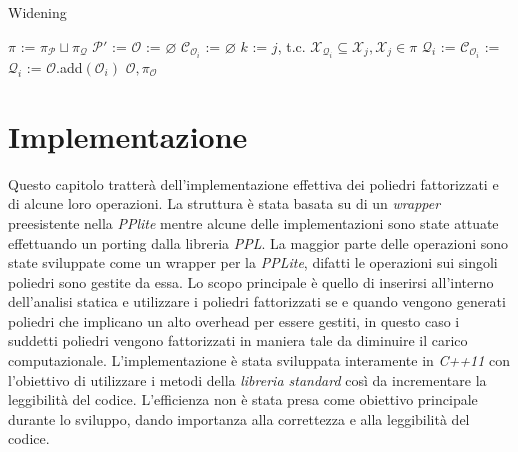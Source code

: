 \documentclass{mimosis}
\theoremstyle{definition}
\let\emptyset\varnothing
\begin{document}
\begin{algorithm}[H]
\caption{Widening}\label{widening}
\begin{algorithmic}[1]
\State $\pi$ := $\pi_{\mathcal{P}} \sqcup \pi_{\mathcal{Q}}$
\State $\mathcal{P}'$ := 
\State $\mathcal{O}$ := $\emptyset$
\State $\mathcal{C}_{\mathcal{O}_i}$ := $\emptyset$
\State $k$ := $j$, t.c. $\mathcal{X}_{\mathcal{Q}_i} \subseteq \mathcal{X}_j, \mathcal{X}_j \in \pi$
\State $\mathcal{Q}_i$ := 
\Else
\State $\mathcal{C}_{\mathcal{O}_i}$ := 
\State $\mathcal{Q}_i$ := 
\EndIf
\State $\mathcal{O}$.add$(\mathcal{O}_i)$
\EndFor
\State\Return $\mathcal{O}, \pi_{\mathcal{O}}$
\EndFunction
\end{algorithmic}
\end{algorithm}

\chapter{Implementazione}
\label{sec:org0925812}
Questo capitolo tratterà dell'implementazione effettiva dei poliedri
fattorizzati e di alcune loro operazioni. La struttura è stata basata su di un
\emph{wrapper} preesistente nella \emph{PPlite} mentre alcune delle implementazioni sono
state attuate effettuando un porting dalla libreria \emph{PPL}. La maggior parte delle
operazioni sono state sviluppate come un wrapper per la \emph{PPLite}, difatti le
operazioni sui singoli poliedri sono gestite da essa. Lo scopo principale è
quello di inserirsi all'interno dell'analisi statica e utilizzare i poliedri
fattorizzati se e quando vengono generati poliedri che implicano un alto
overhead per essere gestiti, in questo caso i suddetti poliedri vengono
fattorizzati in maniera tale da diminuire il carico computazionale.
L'implementazione è stata sviluppata interamente in \emph{C++11} con l'obiettivo di
utilizzare i metodi della \emph{libreria standard} così da incrementare la leggibilità
del codice. L'efficienza non è stata presa come obiettivo principale durante lo
sviluppo, dando importanza alla correttezza e alla leggibilità del codice.
\end{document}
